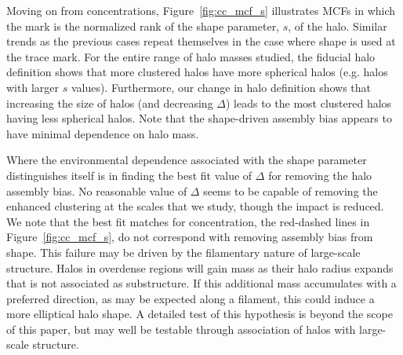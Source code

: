 \documentclass[usenatbib,fleqn]{mnras}
\begin{document}
Moving on from concentrations, Figure~\ref{fig:cc_mcf_s} illustrates MCFs in which the mark is the normalized rank of the shape parameter, $s$, of the halo. Similar trends as the previous cases repeat themselves in the case where shape is used at the trace mark. For the entire range of halo masses studied, the fiducial halo definition shows that more clustered halos have more spherical halos (e.g. halos with larger $s$ values). Furthermore, our change in halo definition shows that increasing the size of halos (and decreasing $\Delta$) leads to the most clustered halos having less spherical halos. Note that the shape-driven assembly bias appears to have minimal dependence on halo mass.

Where the environmental dependence associated with the shape parameter distinguishes itself is in finding the best fit value of $\Delta$ for removing the halo assembly bias. No reasonable value of $\Delta$ seems to be
capable of removing the enhanced clustering at the scales that we study, though the impact is reduced. We note that the best fit matches for concentration, the red-dashed lines in Figure~\ref{fig:cc_mcf_s}, do not correspond with removing assembly bias from shape. This failure may be driven by the filamentary nature of large-scale structure. Halos in overdense regions will gain mass as their halo radius expands that is not associated as substructure. If this additional mass accumulates with a preferred direction, as may be expected along a filament, this could induce a more elliptical halo shape. A detailed test of this hypothesis is beyond the scope of this paper, but may well be testable through association of halos with large-scale structure.
\end{document}

